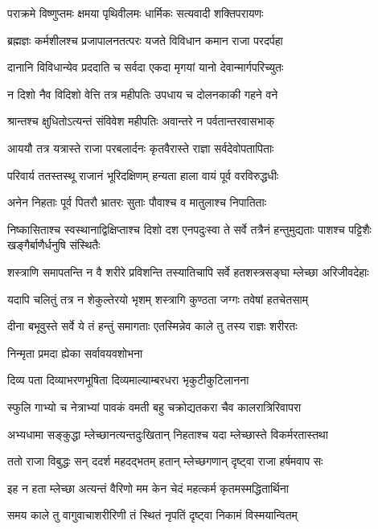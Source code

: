 \twolineshloka
{पराक्रमे विष्णुप्तमः क्षमया पृथिवीलमः}
{धार्मिकः सत्यवादी शक्तिपरायणः} %

\twolineshloka
{ब्रह्मज्ञः कर्मशीलश्च प्रजापालनतत्परः}
{यजते विविधान कमान राजा परदर्पहा} %

\twolineshloka
{दानानि विविधान्येव प्रददाति च सर्वदा}
{एकदा मृगयां यानो देवान्मार्गपरिच्युतः} %

\twolineshloka
{न दिशो नैव विदिशो वेत्ति तत्र महीपतिः}
{उपधाय च दोलनकाकी गहने वने} %

\twolineshloka
{श्रान्तश्च क्षुधितोऽत्यन्तं संविवेश महीपतिः}
{अवान्तरे न पर्वतान्तरवासभाक्} %

\twolineshloka
{आययौ तत्र यत्रास्ते राजा परबलार्दनः}
{कृतवैरास्ते राज्ञा सर्वदेवोपतापिताः} %

\twolineshloka
{परिवार्य ततस्तस्थू राजानं भूरिदक्षिणम्}
{हन्यता हाला वायं पूर्व वरविरुद्धधीः} %

\twolineshloka
{अनेन निहताः पूर्व पितरौ भ्रातरः सुताः}
{पौवाश्च व मातुलाश्च निपातिताः} %


\threelineshloka
{निष्कासिताश्च स्वस्थानाद्विक्षिप्ताश्च दिशो दश}
{एनपदुःस्वा ते सर्वे तत्रैनं हन्तुमुद्यताः}
{पाशश्च पट्टिशैः खङ्गैर्बाणैर्धनुषि संस्थितैः} %

\twolineshloka
{शस्त्राणि समापतन्ति न वै शरीरे प्रविशन्ति}
{तस्यातिचापि सर्वे हतशस्त्रसङ्घा म्लेच्छा अरिजीवदेहाः} %

\twolineshloka
{यदापि चलितुं तत्र न शेकुल्तेरयो भृशम्}
{शस्त्रागि कुण्ठता जग्गः तवेषां हतचेतसाम्} %

\twolineshloka
{दीना बभूवुस्ते सर्वे ये तं हन्तुं समागताः}
{एतस्मिन्नेव काले तु तस्य राज्ञः शरीरतः} %

\onelineshloka
{निन्मृता प्रमदा ह्येका सर्वावयवशोभना} %

\twolineshloka
{दिव्य पता दिव्याभरणभूषिता}
{दिव्यमाल्याम्बरधरा भृकुटीकुटिलानना} %

\twolineshloka
{स्फुलि गाभ्यो च नेत्राभ्यां पावकं वमती बहु}
{चक्रोद्यतकरा चैव कालरात्रिरिवापरा} %

\twolineshloka
{अभ्यधामा सङ्कुद्धा म्लेच्छानत्यन्तदुःखितान्}
{निहताश्च यदा म्लेच्छास्ते विकर्मरतास्तथा} %

\twolineshloka
{ततो राजा विबुद्धः सन् ददर्श महदद्भतम्}
{हतान् म्लेच्छगणान् दृष्ट्वा राजा हर्षमवाप सः} %

\twolineshloka
{इह न हता म्लेच्छा अत्यन्तं वैरिणो मम}
{केन चेदं महत्कर्म कृतमस्मद्धितार्थिना} %

\twolineshloka
{समय काले तु वागुवाचाशरीरिणी}
{तं स्थितं नृपतिं दृष्ट्वा निकामं विस्मयान्वितम्} %


